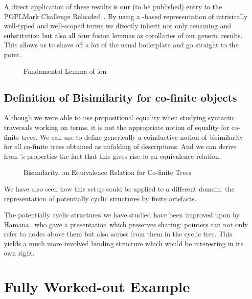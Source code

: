 A direct application of these results is our (to be published) entry to the
POPLMark Challenge Reloaded~\cite{poplmarkreloaded}. By using a -based
representation of intrisically well-typed and well-scoped terms we directly inherit
not only renaming and substitution but also all four fusion lemmas as corollaries
of our generic results. This allows us to shave off a lot of the usual boilerplate
and go straight to the point.

\begin{figure}[h]
\caption{Fundamental Lemma of ion}
\end{figure}



\subsection{Definition of Bisimilarity for co-finite objects}

Although we were able to use propositional equality when studying
syntactic traversals working on terms, it is not the appropriate
notion of equality for co-finite trees. We can use  to
define generically a coinductive notion of bisimilarity for all
co-finite trees obtained as unfolding of descriptions. And we
can derive from 's properties the fact that this gives
rise to an equivalence relation.

\begin{figure}[h]
\caption{Bisimilarity, an Equivalence Relation for Co-finite Trees}
\end{figure}



We have also seen how this setup
could be applied to a different domain: the representation of potentially
cyclic structures by finite artefacts.


The potentially cyclic structures we have studied have been improved
upon by Hamana~\citeyear{Hamana2009} who gave a presentation which
preserves sharing: pointers can not only refer to nodes above them
but also across from them in the cyclic tree. This yields a much more
involved binding structure which would be interesting in its own right.


\section{Fully Worked-out Example}

